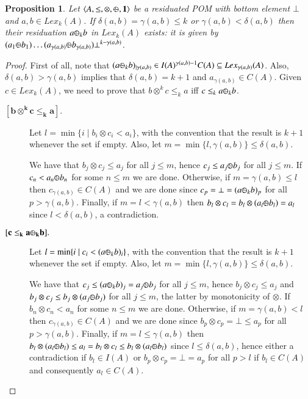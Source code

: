 \documentclass[a4paper]{elsarticle}
\newtheorem{proposition}{Proposition}
\newcommand{\monop}{\otimes}
\newcommand{\1}{\mathbf{1}}
\def\odiv{{ \ominus\hspace{-8pt}:}\;}
\begin{document}
\begin{proposition}
	\label{div2}
	Let $\langle A, \leq, \monop, \odiv, \1 \rangle$
	be a residuated POM with bottom element $\bot$ and $a, b \in Lex_k(A)$.
	If $\delta(a,b) = \gamma(a,b) \leq k$ or $ \gamma(a,b) < \delta(a,b)$
	then their residuation $a \odiv_k b$ 
	in $Lex_k(A)$ exists: it is given by
	$(a_1 \odiv b_1) \ldots  (a_{\gamma(a, b)}  \odiv b_{\gamma(a, b)}) 
	\bot^{k - \gamma(a, b)}$.
\end{proposition}

\begin{proof}
	First of all, note that 
	$(a \odiv_k b)_{\mid \gamma(a,b)} \in I(A)^{\gamma(a,b)-1} C(A) \subseteq Lex_{\gamma(a,b)}(A)$.
	Also, $\delta(a,b) >  \gamma(a,b)$ implies that 
	$\delta(a,b) = k+1$ and $a_{\gamma(a,b)} \in C(A)$.
	Given $c \in Lex_k(A)$, we need to prove that
	$b\otimes^k c \leq_k a$ iff $c \leq_k a \odiv_k b$.
	
	\begin{description}
		\item[$\mathbf{[b\otimes^k c \leq_k a].}$]
		Let $l = \min \{ i \mid b_i \otimes c_i < a_i\}$,
		with the convention that the result is $k+1$ whenever the set if empty.
		Also, let $m = \min \{l, \gamma(a,b)\} \leq \delta(a,b)$.
		
		We have that $b_j \otimes c_j \leq a_j$ for all $j \leq m$, hence
		$c_j \leq a_j \odiv b_j $ for all $j \leq m$. 
		If $c_n < a_n \odiv b_n$ for some $n \leq m$
		we are done. 
		Otherwise, if $m = \gamma(a,b) \leq l$ then 
		$c_{\gamma(a,b)} \in C(A)$ and we are done since
		$c_p = \bot = (a \odiv_k b)_p$ for all $p > {\gamma(a,b)}$.
		Finally, if $m = l < \gamma(a,b)$ then 
		$b_l \otimes c_l = b_l \otimes (a_l \odiv b_l) = a_l$
		since $l < \delta(a,b)$, a contradiction.
		
		\item[$\mathbf{[c \leq_k a \odiv_k b].}$]
		Let $l = \min \{ i \mid c_i < (a \odiv_k b)_i\}$,
		with the convention that the result is $k+1$ whenever the set if empty.
		Also, let $m = \min \{l, \gamma(a,b)\} \leq \delta(a,b)$.
		
		We have that $c_j \leq (a \odiv_k b)_j = a_j \odiv b_j$ for all $j \leq m$, hence
		$b_j \otimes c_j \leq a_j$ and $b_j \otimes c_j \leq b_j \otimes (a_j \odiv b_j)$ 
		for all $j \leq m$, the latter by monotonicity of $\otimes$.
		If $b_n \otimes c_n < a_n$ for some $n \leq m$
		we are done. 
		Otherwise, if $m = \gamma(a,b) < l$ then 
		$c_{\gamma(a,b)} \in C(A)$ and we are done since
		$b_p \otimes c_p = \bot \leq a_p$ for all $p > {\gamma(a,b)}$.
		Finally, if $m = l \leq \gamma(a,b)$ then 
		$b_l \otimes (a_l \odiv b_l) \leq a_l  = b_l \otimes c_l \leq b_l \otimes (a_l \odiv b_l)$
		since $l \leq \delta(a,b)$, hence either a contradiction
		if $b_l \in I(A)$ or $b_p \otimes c_p = \bot = a_p$ for all $p > l$
		if $b_l \in C(A)$ and consequently $a_l \in C(A)$. \qedhere
	\end{description}
\end{proof}
\end{document}
